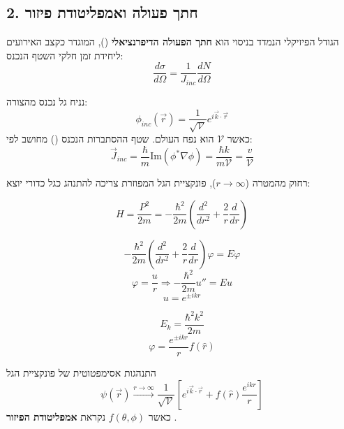\begin{center}
\end{center}

\subsection*{2. חתך פעולה ואמפליטודת פיזור}
הגודל הפיזיקלי הנמדד בניסוי הוא \textbf{חתך הפעולה הדיפרנציאלי} (), המוגדר כקצב האירועים ליחידת זמן חלקי השטף הנכנס:
$$\frac{d\sigma}{d\Omega} = \frac{1}{J_{inc}} \frac{dN}{d\Omega}$$

נניח גל נכנס מהצורה:
$$\phi_{inc}(\vec{r}) = \frac{1}{\sqrt{\mathcal{V}}} e^{i\vec{k}\cdot\vec{r}}$$
כאשר $\mathcal{V}$ הוא נפח העולם. שטף ההסתברות הנכנס () מחושב לפי:
$$\vec{J}_{inc} = \frac{\hbar}{m} \text{Im}(\phi^* \nabla \phi) = \frac{\hbar k}{m \mathcal{V}} = \frac{v}{\mathcal{V}}$$

רחוק מהמטרה ($r \to \infty$), פונקציית הגל המפוזרת צריכה להתנהג כגל כדורי יוצא:

\[H=\frac{P^2}{2m}=-\frac{\hbar ^2}{2m}\left(\frac{d^2}{dr^2}+\frac{2}{r}\frac{d}{dr}\right)\]

\[-\frac{\hbar ^2}{2m}\left(\frac{d^2}{dr^2}+\frac{2}{r}\frac{d}{dr}\right) \varphi=E \varphi\]
\[\varphi= \frac{u}{r} \Rightarrow - \frac{\hbar^2}{2m} u''=Eu\]
\[u=e^{\pm ikr}\]

\[\boxed{E_k=\frac{\hbar^2 k^2}{2m}}\]
\[\varphi=\frac{e^{\pm i  k r}}{r }f(\hat{r})\]

\begin{resultbox}{התנהגות אסימפטוטית של פונקציית הגל}
$$\psi(\vec{r}) \xrightarrow{r \to \infty} \frac{1}{\sqrt{\mathcal{V}}} \left[ e^{i\vec{k}\cdot\vec{r}} + f(\hat{r}) \frac{e^{ikr}}{r} \right]$$
כאשר $f(\theta, \phi)$ נקראת \textbf{אמפליטודת הפיזור} .
\end{resultbox}

